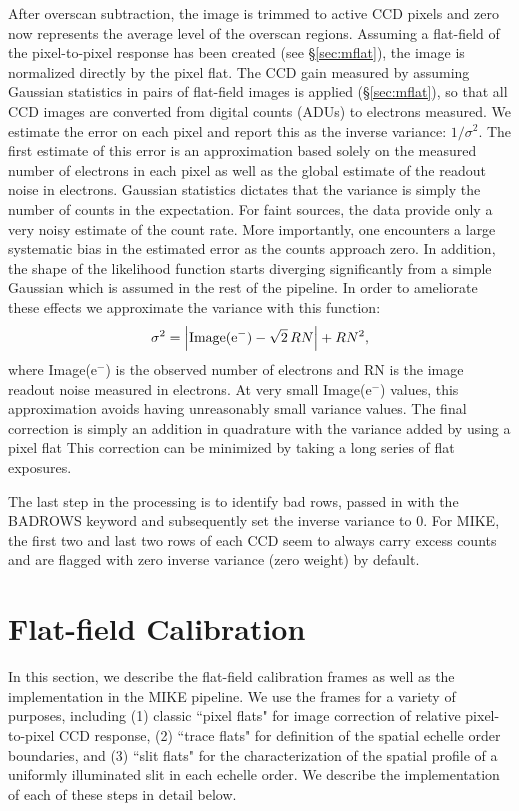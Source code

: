 \documentclass[12pt,preprint]{aastex}
\begin{document}
After overscan subtraction, the image is trimmed to active CCD pixels
and zero now represents the average level of the overscan regions.  
Assuming a flat-field of the pixel-to-pixel response has been created
(see \S\ref{sec:mflat}), the image is normalized directly by the pixel flat.
The CCD gain measured by assuming Gaussian statistics in pairs of flat-field
images is applied (\S\ref{sec:mflat}), 
so that all CCD images are converted from digital counts (ADUs)
to electrons measured.
We estimate the error on each pixel and report this as the inverse
variance: $1/\sigma^2$.  
The first estimate of this error is an approximation
based solely on the measured number of electrons in each pixel as well as
the global estimate of the readout noise in electrons.  Gaussian statistics
dictates that the variance is simply the number of counts in the expectation.
For faint sources, the data provide only a very
noisy estimate of the count rate. 
More importantly, one encounters a large
systematic bias in the estimated error as the counts approach zero.  
In addition, the shape of the likelihood function starts diverging 
significantly from a simple Gaussian which is assumed in the rest of 
the pipeline.  In order to ameliorate these effects we approximate the
variance with this function:
\begin{equation}
\sigma^2 = \left|{\rm Image(e^{-})} - \sqrt{2}\,RN\right| + RN^2,
\end{equation}
where Image(e$^-$) is the observed number of electrons and
RN is the image readout noise measured in electrons.
At very small Image(e$^-$) values, this approximation avoids
having unreasonably small variance values.
The final correction is simply an addition in quadrature with
the variance added by using a pixel flat
This correction can be minimized by taking a long series of flat exposures.

The last step in the processing is to identify bad rows, passed in with 
the BADROWS keyword and subsequently set the inverse variance to 0.
For MIKE, the first two and last two rows of each CCD seem to always
carry excess counts and are flagged with zero inverse variance (zero weight)
by default.

\section{Flat-field Calibration}
\label{sec:flatfield}

In this section, we describe the flat-field calibration frames
as well as the implementation in the MIKE pipeline.  We
use the frames for a variety of purposes, including 
(1) classic ``pixel flats" for image correction of relative 
pixel-to-pixel CCD response, 
(2) ``trace flats" for definition of the spatial echelle order boundaries, and
(3) ``slit flats" for the characterization of the spatial profile 
of a uniformly illuminated slit in each echelle order.
We describe the implementation of each of these steps in detail below.
\end{document}
